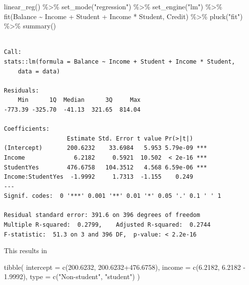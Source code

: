 \documentclass[
  letterpaper,
  DIV=11,
  numbers=noendperiod]{scrreprt}
\newenvironment{Shaded}{\begin{snugshade}}{\end{snugshade}}
\newcommand{\AttributeTok}[1]{\textcolor[rgb]{0.65,0.35,0.00}{#1}}
\newcommand{\FloatTok}[1]{\textcolor[rgb]{0.65,0.35,0.00}{#1}}
\newcommand{\FunctionTok}[1]{\textcolor[rgb]{0.02,0.16,0.49}{#1}}
\newcommand{\NormalTok}[1]{\textcolor[rgb]{0.33,0.33,0.33}{#1}}
\newcommand{\SpecialCharTok}[1]{\textcolor[rgb]{0.00,0.46,0.62}{#1}}
\newcommand{\StringTok}[1]{\textcolor[rgb]{0.00,0.50,0.00}{#1}}
\begin{document}
\begin{Shaded}
\begin{Highlighting}[]
\FunctionTok{linear\_reg}\NormalTok{() }\SpecialCharTok{\%\textgreater{}\%} 
  \FunctionTok{set\_mode}\NormalTok{(}\StringTok{"regression"}\NormalTok{) }\SpecialCharTok{\%\textgreater{}\%} 
  \FunctionTok{set\_engine}\NormalTok{(}\StringTok{"lm"}\NormalTok{) }\SpecialCharTok{\%\textgreater{}\%} 
  \FunctionTok{fit}\NormalTok{(Balance }\SpecialCharTok{\textasciitilde{}}\NormalTok{ Income }\SpecialCharTok{+}\NormalTok{ Student }\SpecialCharTok{+}\NormalTok{ Income }\SpecialCharTok{*}\NormalTok{ Student, Credit) }\SpecialCharTok{\%\textgreater{}\%} 
  \FunctionTok{pluck}\NormalTok{(}\StringTok{"fit"}\NormalTok{) }\SpecialCharTok{\%\textgreater{}\%} 
  \FunctionTok{summary}\NormalTok{()}
\end{Highlighting}
\end{Shaded}

\begin{verbatim}

Call:
stats::lm(formula = Balance ~ Income + Student + Income * Student, 
    data = data)

Residuals:
    Min      1Q  Median      3Q     Max 
-773.39 -325.70  -41.13  321.65  814.04 

Coefficients:
                  Estimate Std. Error t value Pr(>|t|)    
(Intercept)       200.6232    33.6984   5.953 5.79e-09 ***
Income              6.2182     0.5921  10.502  < 2e-16 ***
StudentYes        476.6758   104.3512   4.568 6.59e-06 ***
Income:StudentYes  -1.9992     1.7313  -1.155    0.249    
---
Signif. codes:  0 '***' 0.001 '**' 0.01 '*' 0.05 '.' 0.1 ' ' 1

Residual standard error: 391.6 on 396 degrees of freedom
Multiple R-squared:  0.2799,    Adjusted R-squared:  0.2744 
F-statistic:  51.3 on 3 and 396 DF,  p-value: < 2.2e-16
\end{verbatim}

This results in

\begin{Shaded}
\begin{Highlighting}[]
\FunctionTok{tibble}\NormalTok{(}
  \AttributeTok{intercept =} \FunctionTok{c}\NormalTok{(}\FloatTok{200.6232}\NormalTok{, }\FloatTok{200.6232+476.6758}\NormalTok{),}
  \AttributeTok{income =} \FunctionTok{c}\NormalTok{(}\FloatTok{6.2182}\NormalTok{, }\FloatTok{6.2182} \SpecialCharTok{{-}} \FloatTok{1.9992}\NormalTok{),}
  \AttributeTok{type =} \FunctionTok{c}\NormalTok{(}\StringTok{"Non{-}student"}\NormalTok{, }\StringTok{"student"}\NormalTok{)}
\NormalTok{)}
\end{Highlighting}
\end{Shaded}
\end{document}

